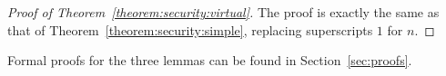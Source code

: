 \begin{proof}[Proof of Theorem~\ref{theorem:security:virtual}]
  The proof is exactly the same as that of
  Theorem~\ref{theorem:security:simple}, replacing superscripts $1$ for $n$.
\end{proof}

  Formal proofs for the three lemmas can be found in Section~\ref{sec:proofs}.

